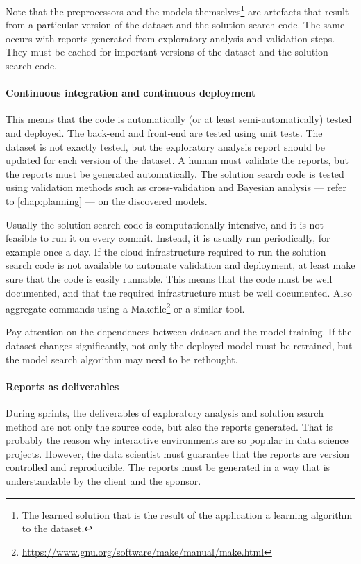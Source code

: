 Note that the preprocessors and the models themselves\footnote{The learned
solution that is the result of the application a learning algorithm to the dataset.} are
artefacts that result from a particular version of the dataset and the solution search
code.  The same occurs with reports generated from exploratory analysis and validation
steps.  They must be cached for important versions of the dataset and the solution search
code.

\paragraph{Continuous integration and continuous deployment}

This means that the code is
automatically (or at least semi-automatically) tested and deployed.  The back-end and
front-end are tested using unit tests.  The dataset is not exactly tested, but the
exploratory analysis report should be updated for each version of the dataset.
A human must validate the reports, but the reports must be generated automatically.
The solution search code is tested using
validation methods such as cross-validation and Bayesian analysis --- refer to
\cref{chap:planning} --- on the discovered models.

Usually the solution search code is computationally intensive, and it is
not feasible to run it on every commit.  Instead, it is usually run periodically, for example
once a day.  If the cloud infrastructure required to run the solution search code is not
available to automate validation and deployment, at least make sure that the code is
easily runnable.  This means that the code must be well documented, and that the
required infrastructure must be well documented.  Also aggregate commands using a
Makefile\footnote{\url{https://www.gnu.org/software/make/manual/make.html}} or a similar tool.

Pay attention on the dependences between dataset and the
model training.  If the dataset changes significantly, not only the deployed model
must be retrained, but the model search algorithm may need to be rethought.

\paragraph{Reports as deliverables}

During sprints, the deliverables of exploratory analysis and solution search method are
not only the source code, but also the reports generated.  That is probably the reason why
interactive environments are so popular in data science projects.  However, the data
scientist must guarantee that the reports are version controlled and reproducible.  The
reports must be generated in a way that is understandable by the client and the sponsor.


